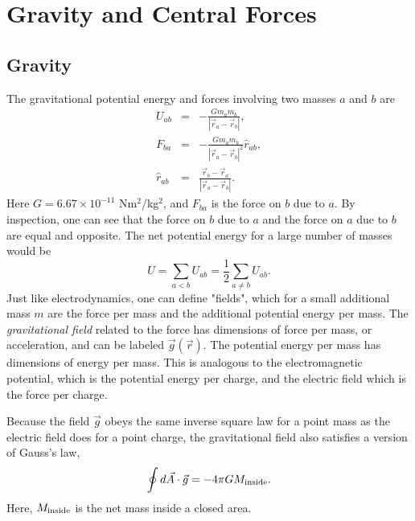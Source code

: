 %

\section{Gravity and Central Forces}
\bigskip

\subsection{Gravity}

The gravitational potential energy and forces involving two masses $a$ and $b$ are
\begin{eqnarray}
U_{ab}&=&-\frac{Gm_am_b}{|\vec{r}_a-\vec{r}_b|},\\
\nonumber
F_{ba}&=&-\frac{Gm_am_b}{|\vec{r}_a-\vec{r}_b|^2}\hat{r}_{ab},\\
\nonumber
\hat{r}_{ab}&=&\frac{\vec{r}_b-\vec{r}_a}{|\vec{r}_a-\vec{r}_b|}.
\end{eqnarray}
Here $G=6.67\times 10^{-11}$ Nm$^2$/kg$^2$, and $F_{ba}$ is the force on $b$ due to $a$. By inspection, one can see that the force on $b$ due to $a$ and the force on $a$ due to $b$ are equal and opposite. The net potential energy for a large number of masses would be
\begin{equation}
U=\sum_{a<b}U_{ab}=\frac{1}{2}\sum_{a\ne b}U_{ab}.
\end{equation}
Just like electrodynamics, one can define "fields", which for a small additional mass $m$ are the force per mass and the additional potential energy per mass. The {\it gravitational field} related to the force has dimensions of force per mass, or acceleration, and can be labeled $\vec{g}(\vec{r})$. The potential energy per mass has dimensions of energy per mass. This is analogous to the electromagnetic potential, which is the potential energy per charge, and the electric field which is the force per charge.

Because the field $\vec{g}$ obeys the same inverse square law for a point mass as the electric field does for a point charge, the gravitational field also satisfies a version of Gauss's law,
\begin{equation}
\label{eq:GravGauss}
\oint d\vec{A}\cdot\vec{g}=-4\pi GM_{\rm inside}.
\end{equation}
Here, $M_{\rm inside}$ is the net mass inside a closed area.

